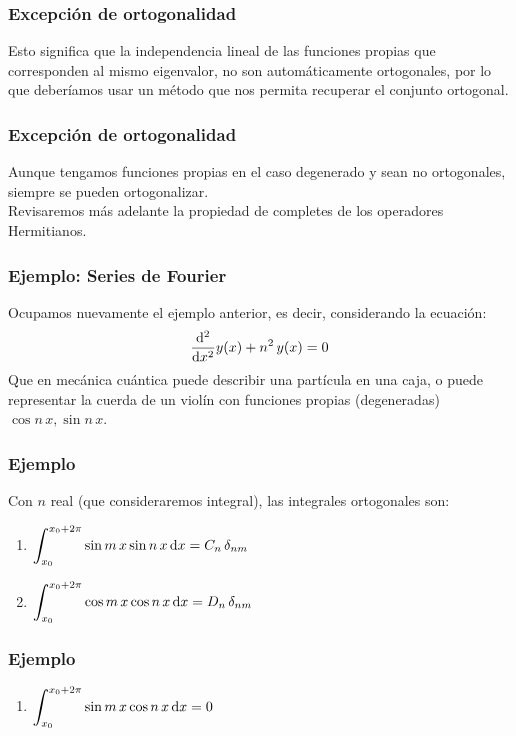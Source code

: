 \documentclass[12pt]{beamer}
\begin{document}
\begin{frame}
\frametitle{Excepción de ortogonalidad}
Esto significa que la independencia lineal de las funciones propias que corresponden al mismo eigenvalor, no son automáticamente ortogonales, por lo que deberíamos usar un método que nos permita recuperar el conjunto ortogonal.  
\end{frame}
\begin{frame}
\frametitle{Excepción de ortogonalidad}
Aunque tengamos funciones propias en el caso degenerado y sean no ortogonales, siempre se pueden ortogonalizar.
\\
\bigskip
\pause
Revisaremos más adelante la propiedad de completes de los operadores Hermitianos.
\end{frame}
\begin{frame}
\frametitle{Ejemplo: Series de Fourier}
Ocupamos nuevamente el ejemplo anterior, es decir, considerando la ecuación:
\pause
\begin{align*}
\dv[2]{x} y(x) + n^{2} \, y(x) = 0
\end{align*}
Que en mecánica cuántica puede describir una partícula en una caja, o puede representar la cuerda de un violín con funciones propias (degeneradas) $\cos n \, x, \sin n \, x$.
\end{frame}
\begin{frame}
\frametitle{Ejemplo}
Con $n$ real (que consideraremos integral), las integrales ortogonales son:
\pause
{}
\begin{enumerate}[<+->]
\item $\begin{aligned}[t] \scaleint{6ex}_{\bs x_{0}}^{x_{0} + 2 \pi} \sin m \, x \sin n \, x \dd{x} = C_{n} \, \delta_{nm} \end{aligned} $ 
\item $\begin{aligned}[t] \scaleint{6ex}_{\bs x_{0}}^{x_{0} + 2 \pi} \cos m \, x \cos n \, x \dd{x} = D_{n} \, \delta_{nm} \end{aligned} $ 
\seti
\end{enumerate}
\end{frame}
\begin{frame}
\frametitle{Ejemplo}
\begin{enumerate}[<+->]
\conti
\item $\begin{aligned}[t] \scaleint{6ex}_{\bs x_{0}}^{x_{0} + 2 \pi} \sin m \, x \cos n \, x \dd{x} = 0 \end{aligned} $
\end{enumerate}
\end{frame}
\end{document}
